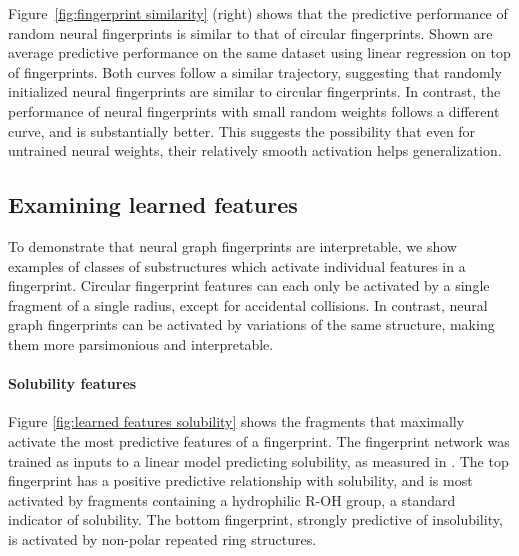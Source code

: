 \documentclass{article}
\newcommand{\citep}{\cite}
\begin{document}
Figure~\ref{fig:fingerprint similarity} (right) shows that the predictive performance of random neural fingerprints is similar to that of circular fingerprints.
Shown are average predictive performance on the same dataset using linear regression on top of fingerprints.
Both curves follow a similar trajectory, suggesting that randomly initialized neural fingerprints are similar to circular fingerprints.
In contrast, the performance of neural fingerprints with small random weights follows a different curve, and is substantially better.
This suggests the possibility that even for untrained neural weights, their relatively smooth activation helps generalization.

\subsection{Examining learned features}
To demonstrate that neural graph fingerprints are interpretable, we show examples of classes of substructures which activate individual features in a fingerprint.
Circular fingerprint features can each only be activated by a single fragment of a single radius, except for accidental collisions.
In contrast, neural graph fingerprints can be activated by variations of the same structure, making them more parsimonious and interpretable.

\paragraph{Solubility features}
Figure \ref{fig:learned features solubility} shows the fragments that maximally activate the most predictive features of a fingerprint.
The fingerprint network was trained as inputs to a linear model predicting solubility, as measured in \citep{delaney_data_2004}.
The top fingerprint has a positive predictive relationship with solubility, and is most activated by fragments containing a hydrophilic R-OH group, a standard indicator of solubility.
The bottom fingerprint, strongly predictive of insolubility, is activated by non-polar repeated ring structures.
\end{document}

